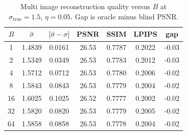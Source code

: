 \begin{table}[h]
\centering
\small
\begin{tabular}{ccccccc}
\toprule
$B$ & $\hat{\sigma}$ & $|\hat{\sigma} - \sigma|$ & PSNR & SSIM & LPIPS & gap \\
\midrule
1 & 1.4839 & 0.0161 & 26.53 & 0.7787 & 0.2022 & -0.03 \\
2 & 1.5349 & 0.0349 & 26.53 & 0.7783 & 0.2012 & -0.03 \\
4 & 1.5712 & 0.0712 & 26.53 & 0.7780 & 0.2006 & -0.02 \\
8 & 1.5843 & 0.0843 & 26.53 & 0.7779 & 0.2004 & -0.02 \\
16 & 1.6025 & 0.1025 & 26.52 & 0.7777 & 0.2002 & -0.02 \\
32 & 1.5820 & 0.0820 & 26.53 & 0.7779 & 0.2005 & -0.02 \\
64 & 1.5858 & 0.0858 & 26.53 & 0.7778 & 0.2004 & -0.02 \\
\bottomrule
\end{tabular}
\caption{Multi image reconstruction quality versus $B$ at $\sigma_{\text{true}} = 1.5$, $\eta = 0.05$. Gap is oracle minus blind PSNR.}
\label{tab:multi_image_reconstruction}
\end{table}
